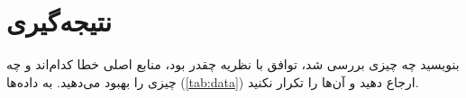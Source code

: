 \section{نتیجه‌گیری}

بنویسید چه چیزی بررسی شد، توافق با نظریه چقدر بود، منابع اصلی خطا کدام‌اند و چه چیزی را بهبود می‌دهید.
به داده‌ها (\cref{tab:data}) ارجاع دهید و آن‌ها را تکرار نکنید.
